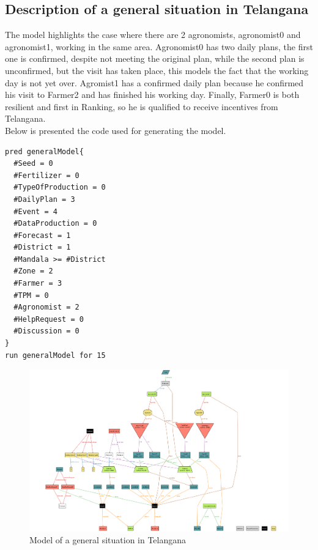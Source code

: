 \subsection{Description of a general situation in Telangana}
The model highlights the case where there are 2 agronomists, agronomist0 and agronomist1, working in the same area.  Agronomist0 has two daily plans, the first one is confirmed, despite not meeting the original plan, while the second plan is unconfirmed, but the visit has taken place, this models the fact that the working day is not yet over. Agromist1 has a confirmed daily plan because he confirmed his visit to Farmer2 and has finished his working day.  Finally, Farmer0 is both resilient and first in Ranking, so he is qualified to receive incentives from Telangana.\\
Below is presented the code used for generating the model.
\begin{lstlisting}[language=alloy]
pred generalModel{
  #Seed = 0
  #Fertilizer = 0
  #TypeOfProduction = 0
  #DailyPlan = 3
  #Event = 4
  #DataProduction = 0
  #Forecast = 1
  #District = 1
  #Mandala >= #District
  #Zone = 2
  #Farmer = 3
  #TPM = 0
  #Agronomist = 2
  #HelpRequest = 0
  #Discussion = 0
}
run generalModel for 15
\end{lstlisting}
\begin{figure}[H]
\centering
	\includegraphics[angle=90,height=1.5\textwidth]{Images/Model/model1.png}
	\caption{Model of a general situation in Telangana}
\end{figure}
